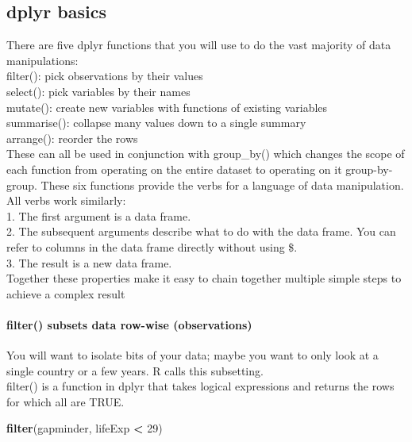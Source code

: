 \documentclass[
]{article}
\newenvironment{Shaded}{\begin{snugshade}}{\end{snugshade}}
\newcommand{\DecValTok}[1]{\textcolor[rgb]{0.00,0.00,0.81}{#1}}
\newcommand{\FunctionTok}[1]{\textcolor[rgb]{0.13,0.29,0.53}{\textbf{#1}}}
\newcommand{\NormalTok}[1]{#1}
\newcommand{\SpecialCharTok}[1]{\textcolor[rgb]{0.81,0.36,0.00}{\textbf{#1}}}
\begin{document}
\subsection{dplyr basics}\label{dplyr-basics}

There are five dplyr functions that you will use to do the vast majority
of data manipulations:\\
filter(): pick observations by their values\\
select(): pick variables by their names\\
mutate(): create new variables with functions of existing variables\\
summarise(): collapse many values down to a single summary\\
arrange(): reorder the rows\\
These can all be used in conjunction with group\_by() which changes the
scope of each function from operating on the entire dataset to operating
on it group-by-group. These six functions provide the verbs for a
language of data manipulation. All verbs work similarly:\\
1. The first argument is a data frame.\\
2. The subsequent arguments describe what to do with the data frame. You
can refer to columns in the data frame directly without using \$.\\
3. The result is a new data frame.\\
Together these properties make it easy to chain together multiple simple
steps to achieve a complex result

\paragraph{filter() subsets data row-wise
(observations)}\label{filter-subsets-data-row-wise-observations}

You will want to isolate bits of your data; maybe you want to only look
at a single country or a few years. R calls this subsetting.\\
filter() is a function in dplyr that takes logical expressions and
returns the rows for which all are TRUE.

\begin{Shaded}
\begin{Highlighting}[]
\FunctionTok{filter}\NormalTok{(gapminder, lifeExp }\SpecialCharTok{\textless{}} \DecValTok{29}\NormalTok{)}
\end{Highlighting}
\end{Shaded}
\end{document}
